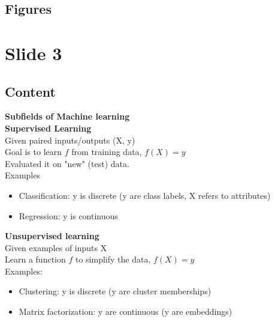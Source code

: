 \documentclass{article}%
\begin{document}
\subsection{Figures}%
\begin{figure}[H]%
\centering%
\end{figure}

%
\newpage%
\section{Slide 3}%
\label{sec:Slide3}%
\subsection{Content}%

\textbf{Subfields of Machine learning} \\
\textbf{Supervised Learning} \\
Given paired inputs/outputs (X, y) \\
Goal is to learn $f$ from training data, $f(X) = y$ \\
Evaluated it on "new" (test) data. \\
Examples \\
\begin{itemize}
\item Classification: y is discrete (y are class labels, X refers to attributes)
\item Regression: y is continuous
\end{itemize}
\textbf{Unsupervised learning} \\
Given examples of inputs X \\
Learn a function $f$ to simplify the data, $f(X) = y$ \\
Examples: \\
\begin{itemize}
\item Clustering: y is discrete (y are cluster memberships)
\item Matrix factorization: y are continuous (y are embeddings)
\end{itemize}
%
\end{document}
